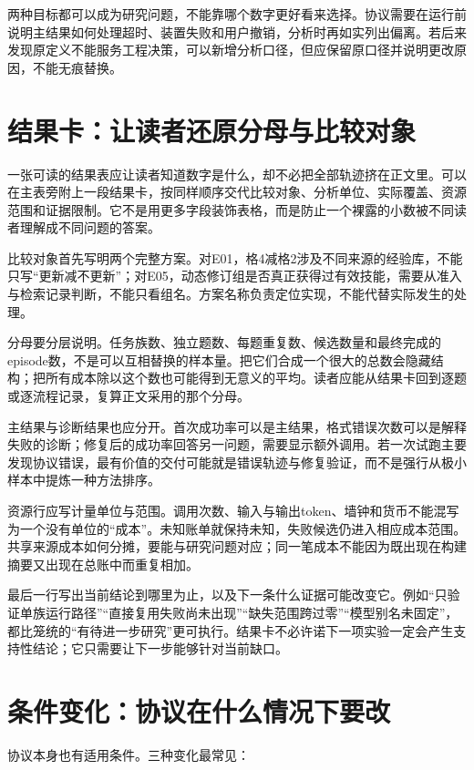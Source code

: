 两种目标都可以成为研究问题，不能靠哪个数字更好看来选择。协议需要在运行前说明主结果如何处理超时、装置失败和用户撤销，分析时再如实列出偏离。若后来发现原定义不能服务工程决策，可以新增分析口径，但应保留原口径并说明更改原因，不能无痕替换。

\section{结果卡：让读者还原分母与比较对象}
\label{sec:ch03-result-card}

一张可读的结果表应让读者知道数字是什么，却不必把全部轨迹挤在正文里。可以在主表旁附上一段结果卡，按同样顺序交代比较对象、分析单位、实际覆盖、资源范围和证据限制。它不是用更多字段装饰表格，而是防止一个裸露的小数被不同读者理解成不同问题的答案。

比较对象首先写明两个完整方案。对E01，格4减格2涉及不同来源的经验库，不能只写“更新减不更新”；对E05，动态修订组是否真正获得过有效技能，需要从准入与检索记录判断，不能只看组名。方案名称负责定位实现，不能代替实际发生的处理。

分母要分层说明。任务族数、独立题数、每题重复数、候选数量和最终完成的episode数，不是可以互相替换的样本量。把它们合成一个很大的总数会隐藏结构；把所有成本除以这个数也可能得到无意义的平均。读者应能从结果卡回到逐题或逐流程记录，复算正文采用的那个分母。

主结果与诊断结果也应分开。首次成功率可以是主结果，格式错误次数可以是解释失败的诊断；修复后的成功率回答另一问题，需要显示额外调用。若一次试跑主要发现协议错误，最有价值的交付可能就是错误轨迹与修复验证，而不是强行从极小样本中提炼一种方法排序。

资源行应写计量单位与范围。调用次数、输入与输出token、墙钟和货币不能混写为一个没有单位的“成本”。未知账单就保持未知，失败候选仍进入相应成本范围。共享来源成本如何分摊，要能与研究问题对应；同一笔成本不能因为既出现在构建摘要又出现在总账中而重复相加。

最后一行写出当前结论到哪里为止，以及下一条什么证据可能改变它。例如“只验证单族运行路径”“直接复用失败尚未出现”“缺失范围跨过零”“模型别名未固定”，都比笼统的“有待进一步研究”更可执行。结果卡不必许诺下一项实验一定会产生支持性结论；它只需要让下一步能够针对当前缺口。


\section{条件变化：协议在什么情况下要改}
\label{sec:ch03-conditions}

\begin{sloppypar}
协议本身也有适用条件。三种变化最常见：
\end{sloppypar}

